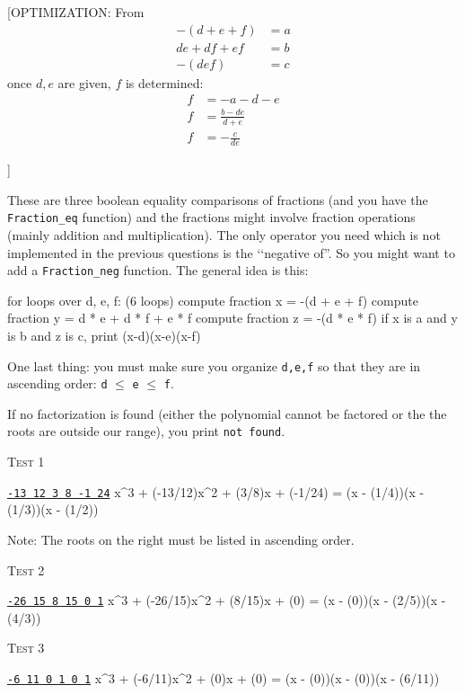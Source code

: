 [OPTIMIZATION:
From
\begin{align*}
  -(d + e + f) &= a \\
  de + df + ef &= b \\
  - (def) &=  c
\end{align*}
once $d,e$ are given, $f$ is determined:
\begin{align*}
  f &= -a - d - e\\
  f &= \frac{b - de}{d + e}\\
  f &=  -\frac{c}{de}
\end{align*}

]

These are three boolean equality comparisons of fractions (and you have the \verb!Fraction_eq! function)
and the fractions might involve fraction operations (mainly addition and multiplication).
The only operator you need which is not implemented in the previous questions is the
\lq\lq negative of''.
So you might want to add a \verb!Fraction_neg! function.
The general idea is this:
\begin{console}
for loops over d, e, f: (6 loops)
         compute fraction x = -(d + e + f)
         compute fraction y = d * e + d * f + e * f
         compute fraction z = -(d * e * f)
         if x is a and y is b and z is c,
             print (x-d)(x-e)(x-f)
\end{console}
One last thing: you must make sure you organize \verb!d,e,f! so that they are in ascending order:
\verb!d!
$\leq$
\verb!e!
$\leq$
\verb!f!.

If no factorization is found (either the polynomial cannot be factored or the
the roots are outside our range), you print \verb!not found!.

\textsc{Test 1}
\begin{console}[commandchars=\\\{\}]
\underline{\texttt{-13 12 3 8 -1 24}}
x^3 + (-13/12)x^2 + (3/8)x + (-1/24) = (x - (1/4))(x - (1/3))(x - (1/2))
\end{console}
Note: The roots on the right must be listed in ascending order.


\textsc{Test 2}
\begin{console}[commandchars=\\\{\}]
\underline{\texttt{-26 15 8 15 0 1}}
x^3 + (-26/15)x^2 + (8/15)x + (0) = (x - (0))(x - (2/5))(x - (4/3))
\end{console}

\textsc{Test 3}
\begin{console}[commandchars=\\\{\}]
\underline{\texttt{-6 11 0 1 0 1}}
x^3 + (-6/11)x^2 + (0)x + (0) = (x - (0))(x - (0))(x - (6/11))
\end{console}


